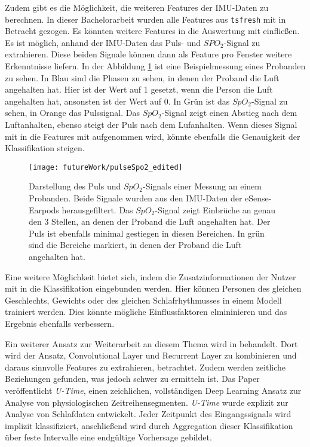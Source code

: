 Zudem gibt es die Möglichkeit, die weiteren Features der IMU-Daten zu berechnen.
In dieser Bachelorarbeit wurden alle Features aus \texttt{tsfresh} mit in Betracht gezogen. 
Es könnten weitere Features in die Auswertung mit einfließen.
Es ist möglich, anhand der IMU-Daten das Puls- und $SPO_2$-Signal zu extrahieren. 
Diese beiden Signale können dann als Feature pro Fenster weitere Erkenntnisse liefern.
In der Abbildung \ref{futureWork:pulseSpo2} ist eine Beispielmessung eines Probanden zu sehen. 
In Blau sind die Phasen zu sehen, in denen der Proband die Luft angehalten hat.
Hier ist der Wert auf 1 gesetzt, wenn die Person die Luft angehalten hat, ansonsten ist der Wert auf 0. 
In Grün ist das $SpO_2$-Signal zu sehen, in Orange das Pulssignal. 
Das $SpO_2$-Signal zeigt einen Abstieg nach dem Luftanhalten, ebenso steigt der Puls nach dem Lufanhalten.
Wenn dieses Signal mit in die Features mit aufgenommen wird, könnte ebenfalls die Genauigkeit der Klassifikation steigen. 
\begin{figure}[ht]
    \centering
    \texttt{[image: futureWork/pulseSpo2\_edited]}
    \caption{Darstellung des Puls und $SpO_2$-Signals einer Messung an einem Probanden. Beide Signale wurden aus den IMU-Daten der eSense-Earpods herausgefiltert. Das $SpO_2$-Signal zeigt Einbrüche an genau den 3 Stellen, an denen der Proband die Luft angehalten hat. Der Puls ist ebenfalls minimal gestiegen in diesen Bereichen. In grün sind die Bereiche markiert, in denen der Proband die Luft angehalten hat.}
    \label{futureWork:pulseSpo2}
\end{figure}

Eine weitere Möglichkeit bietet sich, indem die Zusatzinformationen der Nutzer mit in die Klassifikation eingebunden werden.
Hier können Personen des gleichen Geschlechts, Gewichts oder des gleichen Schlafrhythmusses in einem Modell trainiert werden.
Dies könnte mögliche Einflussfaktoren elmininieren und das Ergebnis ebenfalls verbessern.

Ein weiterer Ansatz zur Weiterarbeit an diesem Thema wird in \cite{perslevUTimeFullyConvolutional2019} behandelt.
Dort wird der Ansatz, Convolutional Layer und Recurrent Layer zu kombinieren und daraus sinnvolle Features zu extrahieren, betrachtet. 
Zudem werden zeitliche Beziehungen gefunden, was jedoch schwer zu ermitteln ist. 
Das Paper veröffentlicht \textit{U-Time}, einen zeichlichen, vollständigen Deep Learning Ansatz zur Analyse von physiologischen Zeitreihensegmenten. 
\textit{U-Time} wurde explizit zur Analyse von Schlafdaten entwickelt.
Jeder Zeitpunkt des Eingangssignals wird implizit klassifiziert, anschließend wird durch Aggregation dieser Klassifikation über feste Intervalle eine endgültige Vorhersage gebildet.